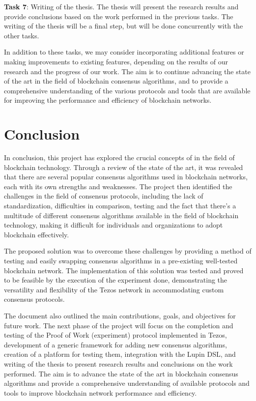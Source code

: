 \textbf{Task 7}: Writing of the thesis. The thesis will present the research results and provide conclusions based on the work performed in the previous tasks. The writing of the thesis will be a final step, but will be done concurrently with the other tasks.

In addition to these tasks, we may consider incorporating additional features or making improvements to existing features, depending on the results of our research and the progress of our work. The aim is to continue advancing the state of the art in the field of blockchain consensus algorithms, and to provide a comprehensive understanding of the various protocols and tools that are available for improving the performance and efficiency of blockchain networks.


\section{Conclusion}

In conclusion, this project has explored the crucial concepts of in the field of blockchain technology. Through a review of the state of the art, it was revealed that there are several popular consensus algorithms used in blockchain networks, each with its own strengths and weaknesses. The project then identified the challenges in the field of consensus protocols, including the lack of standardization, difficulties in comparison, testing and the fact that there's a multitude of different consensus algorithms available in the field of blockchain technology,
making it difficult for individuals and organizations to adopt blockchain effectively.

The proposed solution was to overcome these challenges by providing a method of testing and easily swapping consensus algorithms in a pre-existing well-tested blockchain network.
The implementation of this solution was tested and proved to be feasible by the execution of the experiment done, demonstrating the versatility and flexibility of the Tezos network in accommodating custom consensus protocols.

The document also outlined the main contributions, goals, and objectives for future work.
The next phase of the project will focus on the completion and testing of the Proof of Work (experiment) protocol implemented in Tezos, development of a generic framework for adding new consensus algorithms, creation of a platform for testing them, integration with the Lupin DSL, and writing of the thesis to present research results and conclusions on the work performed. The aim is to advance the state of the art in blockchain consensus algorithms and provide a comprehensive understanding of available protocols and tools to improve blockchain network performance and efficiency.





